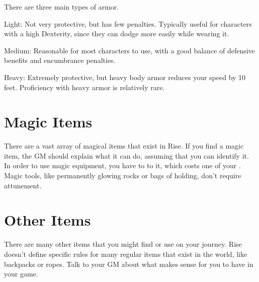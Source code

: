   There are three main types of armor.
  \begin{raggeditemize}
    \item Light: Not very protective, but has few penalties. Typically useful for characters with a high Dexterity, since they can dodge more easily while wearing it.
    \item Medium: Reasonable for most characters to use, with a good balance of defensive benefits and encumbrance penalties.
    \item Heavy: Extremely protective, but heavy body armor reduces your speed by 10 feet. Proficiency with heavy armor is relatively rare.
  \end{raggeditemize}

\section{Magic Items}
  There are a vast array of magical items that exist in Rise.
  If you find a magic item, the GM should explain what it can do, assuming that you can identify it.
  In order to use magic equipment, you have to  to it, which costs one of your .
  Magic tools, like permanently glowing rocks or bags of holding, don't require attunement.

\section{Other Items}
  There are many other items that you might find or use on your journey.
  Rise doesn't define specific rules for many regular items that exist in the world, like backpacks or ropes.
  Talk to your GM about what makes sense for you to have in your game.
